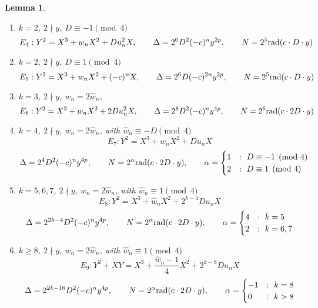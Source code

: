 \documentclass[12pt]{amsart}
\newtheorem{lem}[thm]{Lemma}
\theoremstyle{definition}
\theoremstyle{remark}
\newcommand{\rad}{{\rm{rad}}}
\newcommand{\notdiv}{\nmid}
\begin{document}
\begin{lem}
\begin{enumerate}[1.]
\item $k = 2$, $2 \notdiv y$, $D \equiv -1 \pmod{4}$
\vspace{-5pt}
\[ E_{4} : Y^2 = X^3 + w_nX^2 +Du_n^2X, \qquad \Delta = 2^{6}D^2(-c)^ny^{2p}, \qquad N = 2^{5}\rad( c \cdot D \cdot y )  \]

\item $k = 2$, $2 \notdiv y$,  $D \equiv 1 \pmod{4}$
\vspace{-5pt}
\[E_{5} : Y^2 = X^3 +w_nX^2 +(-c)^nX, \qquad \Delta = 2^{6}D(-c)^{2n}y^{2p}, \qquad N = 2^{5}\rad( c \cdot D \cdot y )  \]

\item $k = 3$, $2 \notdiv y$, $w_n = 2 \hat{w}_n$, 
\vspace{-5pt}
\[ E_{6} : Y^2 = X^3 + w_nX^2 + 2Du_n^2X, \qquad  \Delta = 2^8D^2(-c)^ny^{4p} , \qquad N = 2^6 \rad( c \cdot 2D \cdot y)  \]

\item $k=4$, $2 \notdiv y$, $w_n = 2 \hat{w}_n$,  with $\hat{w}_n \equiv -D \pmod{4}$
\vspace{-5pt}
\[ E_{7} : Y^2 = X^3 +\hat{w}_nX^2 + D u_n X\]
\vspace{-15pt}
 \[ \Delta = 2^4D^2(-c)^ny^{4p}, \qquad N = 2^\alpha \rad( c \cdot 2D \cdot y) ,  \qquad \alpha =  \begin{cases} 1 & : \ D \equiv -1 \pmod{4}\\ 2 & : \ D \equiv 1 \pmod{4} \end{cases} \]


\item $k = 5,6,7$, $2 \notdiv y$, $w_n = 2 \hat{w}_n$, with $\hat{w}_n \equiv 1 \pmod{4}$
\vspace{-5pt}
\[ E_{8} : Y^2 = X^3 + \hat{w}_nX^2 + 2^{k-4}D u_n X \]
\vspace{-20pt}
\[ \Delta = 2^{2k-4}D^2(-c)^ny^{4p}, \qquad N = 2^\alpha \rad(c \cdot 2D \cdot y ) ,  \qquad \alpha =  \begin{cases} 4 &:  \ k = 5 \\ 2 &:  \ k = 6,7 \end{cases} \]


\item $k\geq 8$, $2 \notdiv y$, $w_n = 2 \hat{w}_n$, with $\hat{w}_n \equiv 1 \pmod{4}$
\vspace{-5pt}
\[ E_{9} : Y^2 + XY = X^3 + \frac{\hat{w}_n-1}{4} X^2 + 2^{k-8}D u_n X \]
\vspace{-20pt}
\[ \Delta = 2^{2k-16}D^2(-c)^ny^{4p}, \qquad N = 2^\alpha \rad(c \cdot 2D \cdot y) ,  \qquad \alpha =  \begin{cases} -1&: \ k = 8 \\ 0 &: \ k > 8 \end{cases} \]


\end{enumerate}
\end{lem}
\end{document}
